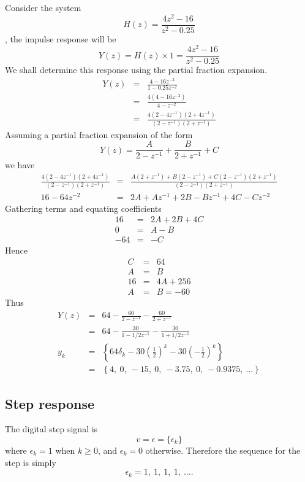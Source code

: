 Consider the system \[ H(z) = \frac{4z^2 - 16}{z^2 - 0.25}\], the
impulse response will be
\[ Y(z) = H(z)\times 1 = \frac{4z^2 - 16}{z^2 - 0.25}\]
We shall determine this response using the partial fraction
expansion.
\begin{eqnarray*}
Y(z) &=& \frac{4 - 16z^{-2}}{1 - 0.25 z^{-2}}\\
     &=& \frac{4(4 - 16z^{-2})}{4 - z^{-2}}\\
     &=& \frac{4(2 - 4z^{-1})(2 + 4z^{-1})}{(2 - z^{-1})(2 + z^{-1})}
\end{eqnarray*}
Assuming a partial fraction expansion of the form \[Y(z) =
\frac{A}{2 - z^{-1}} + \frac{B}{2 + z^{-1}} + C \]  we have
\begin{eqnarray*}
 \frac{4(2 - 4z^{-1})(2 + 4z^{-1})}{(2 - z^{-1})(2 + z^{-1})}
     &=& \frac{A(2 + z^{-1}) + B(2 - z^{-1}) + C(2 - z^{-1})(2 + z^{-1})}{(2 - z^{-1})(2 + z^{-1})}\\
     16 - 64z^{-2} &=& 2A + Az^{-1} + 2B - Bz^{-1} + 4C - Cz^{-2}
 \end{eqnarray*}
Gathering terms and equating coefficients
\begin{eqnarray}
16 &=& 2A +2B + 4C\\ 0 &=& A - B\\ -64 &=& -C
\end{eqnarray}
Hence
\begin{eqnarray}
C &=& 64\\ A &=& B\\ 16 &=& 4A + 256\\ A &=& B = -60
\end{eqnarray}
Thus
\begin{eqnarray*}
    Y(z) &=& 64 -\frac{60}{2-z^{-1}}-\frac{60}{2+z^{-1}}\\
    &=& 64 -\frac{30}{1-1/2 z^{-1}}-\frac{30}{1+1/2 z^{-1}}\\
     y_k& =& \left\{64\delta_k - 30\left(\frac{1}{2}\right)^k - 30
\left(-\frac{1}{2}\right)^k\right\}\\
 &=& \left\{4,\ 0,\ -15,\ 0,\ -3.75,\ 0,\ -0.9375,\ \ldots
 \right\}
\end{eqnarray*}

\subsection*{Step response}
The digital step signal is
\begin{equation}\label{eq:l10e5}
  v = \epsilon = \{\epsilon_k\}
\end{equation}
where $\epsilon_k = 1$ when $k \ge 0$, and $\epsilon_k = 0$
otherwise. Therefore the sequence for the step is simply
\[\epsilon_k = 1,\ 1,\ 1,\ 1,\ \ldots.\]

